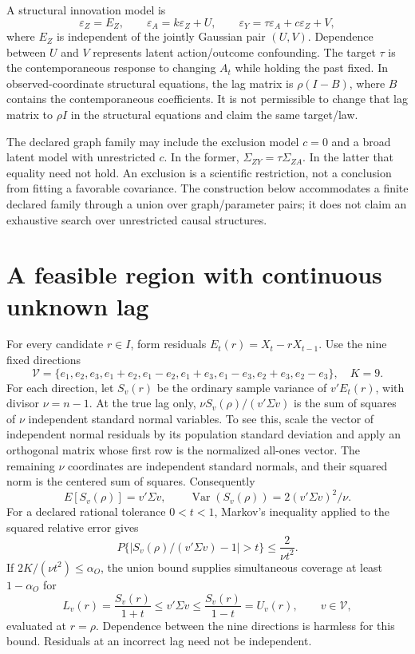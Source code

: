 A structural innovation model is \[
 \varepsilon_Z=E_Z,\qquad
 \varepsilon_A=k\varepsilon_Z+U,\qquad
 \varepsilon_Y=\tau\varepsilon_A+c\varepsilon_Z+V,
\] where \(E_Z\) is independent of the jointly Gaussian pair \((U,V)\).
Dependence between \(U\) and \(V\) represents latent action/outcome
confounding. The target \(\tau\) is the contemporaneous response to
changing \(A_t\) while holding the past fixed. In observed-coordinate
structural equations, the lag matrix is \(\rho(I-B)\), where \(B\)
contains the contemporaneous coefficients. It is not permissible to
change that lag matrix to \(\rho I\) in the structural equations and
claim the same target/law.

The declared graph family may include the exclusion model \(c=0\) and a
broad latent model with unrestricted \(c\). In the former,
\(\Sigma_{ZY}=\tau\Sigma_{ZA}\). In the latter that equality need not
hold. An exclusion is a scientific restriction, not a conclusion from
fitting a favorable covariance. The construction below accommodates a
finite declared family through a union over graph/parameter pairs; it
does not claim an exhaustive search over unrestricted causal structures.

\hypertarget{a-feasible-region-with-continuous-unknown-lag}{%
\section{A feasible region with continuous unknown
lag}\label{a-feasible-region-with-continuous-unknown-lag}}

For every candidate \(r\in I\), form residuals \(E_t(r)=X_t-rX_{t-1}\).
Use the nine fixed directions \[
 \mathcal V=\{e_1,e_2,e_3,e_1+e_2,e_1-e_2,
 e_1+e_3,e_1-e_3,e_2+e_3,e_2-e_3\},\quad K=9.
\] For each direction, let \(S_v(r)\) be the ordinary sample variance of
\(v'E_t(r)\), with divisor \(\nu=n-1\). At the true lag only,
\(\nu S_v(\rho)/(v'\Sigma v)\) is the sum of squares of \(\nu\)
independent standard normal variables. To see this, scale the vector of
independent normal residuals by its population standard deviation and
apply an orthogonal matrix whose first row is the normalized all-ones
vector. The remaining \(\nu\) coordinates are independent standard
normals, and their squared norm is the centered sum of squares.
Consequently \[
 E[S_v(\rho)]=v'\Sigma v,\qquad
 \operatorname{Var}(S_v(\rho))=2(v'\Sigma v)^2/\nu.
\] For a declared rational tolerance \(0<t<1\), Markov's inequality
applied to the squared relative error gives \[
 P\{|S_v(\rho)/(v'\Sigma v)-1|>t\}\le\frac{2}{\nu t^2}.
\] If \(2K/(\nu t^2)\le\alpha_O\), the union bound supplies simultaneous
coverage at least \(1-\alpha_O\) for \[
 L_v(r)=\frac{S_v(r)}{1+t}\le v'\Sigma v
 \le \frac{S_v(r)}{1-t}=U_v(r),\qquad v\in\mathcal V,
\] evaluated at \(r=\rho\). Dependence between the nine directions is
harmless for this bound. Residuals at an incorrect lag need not be
independent.

